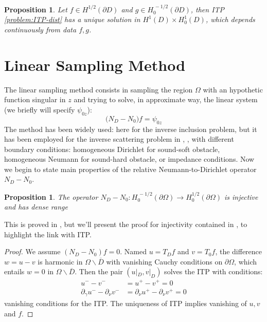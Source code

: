 \documentclass[10pt, a4paper, twoside, openright]{book}
\theoremstyle{definition}
\theoremstyle{plain}
\theoremstyle{plain}
\theoremstyle{plain}
\newtheorem{proposition}[subsection]{Proposition}
\theoremstyle{plain}
\theoremstyle{plain}
\theoremstyle{plain}
\theoremstyle{plain}
\theoremstyle{plain}
\begin{document}
\begin{proposition}
 Let $f\in H^{1/2}(\partial D)$ and $g\in H^{\,-1/2}_0(\partial D)$, then ITP \ref{problem:ITP-dist} has a unique solution in $H^1(D)\times H^1_0(D)$, which depends continuously from data $f,g$.
\end{proposition}

\section{Linear Sampling Method}
 The linear sampling method consists in sampling the region $\Omega$ with an hypothetic function singular in $z$ and trying to solve, in approximate way, the linear system (we briefly will specify $\psi_{0z}$):
 \begin{equation}
 \label{eq:lsm-approximate-lin-eq}
  \bigl({N_D} - {N_0}\bigr)f=\psi_{0z}
 \end{equation}
 The method has been widely used: here for the inverse inclusion problem, but it has been employed for the inverse scattering problem in \cite{cakoni-colton-haddar:lsm}, \cite{colton-haddar-piana:lsm}, with different boundary conditions: homogeneous Dirichlet for sound-soft obstacle, homogeneous Neumann for sound-hard obstacle, or impedance conditions.
 Now we begin to state main properties of the relative Neumann-to-Dirichlet operator ${N_D} - {N_0}$.
 \begin{proposition}
  The operator ${N_D} - {N_0}:H_0^{\,-1/2}(\partial \Omega)\to H_0^{1/2}(\partial \Omega)$ is injective and has dense range
 \end{proposition}
 This is proved in \cite{kirsch:book}, but we'll present the proof for injectivity contained in \cite{somersalo:preprint}, to highlight the link with ITP.
 \begin{proof}
 We assume $({N_D} - {N_0})f = 0$. Named $u=T_Df$ and $v=T_0f$, the difference $w=u-v$ is harmonic in $\Omega\backslash\overline{D}$ with vanishing Cauchy conditions on $\partial \Omega$, which entails $w=0$ in $\Omega\backslash\overline{D}$. Then the pair $(u|_D,v|_D)$ solves the ITP with conditions:
 \begin{align}
  u^--v^- &=u^+ - v^+ = 0 \\
  \partial_\gamma u^- - \partial_\nu v^- &= \partial_\nu u^+ - \partial_\nu v^+ = 0 
 \end{align}
 vanishing conditions for the ITP. The uniqueness of ITP implies vanishing of $u,v$ and $f$. 
 \end{proof}
\end{document}

